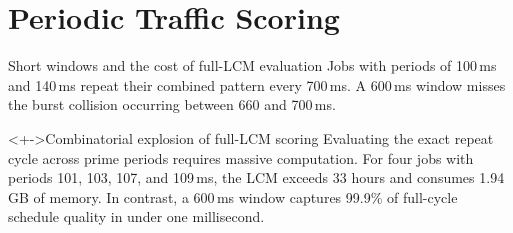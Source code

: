 \documentclass[aspectratio=169,11pt,c]{beamer}
\begin{document}
\section{Periodic Traffic Scoring}

\begin{frame}{Short windows and the cost of full-LCM evaluation}
  \small Jobs with periods of 100\,ms and 140\,ms repeat their combined pattern every 700\,ms. A 600\,ms window misses the burst collision occurring between 660 and 700\,ms.
  \begin{center}
  \end{center}
  \vspace{-0.3em}
  \begin{block}<+->{Combinatorial explosion of full-LCM scoring}
    \scriptsize Evaluating the exact repeat cycle across prime periods requires massive computation. For four jobs with periods 101, 103, 107, and 109\,ms, the LCM exceeds 33 hours and consumes \alert{1.94\,GB} of memory. In contrast, a 600\,ms window captures 99.9\% of full-cycle schedule quality in under one millisecond.
  \end{block}
\end{frame}
\end{document}
